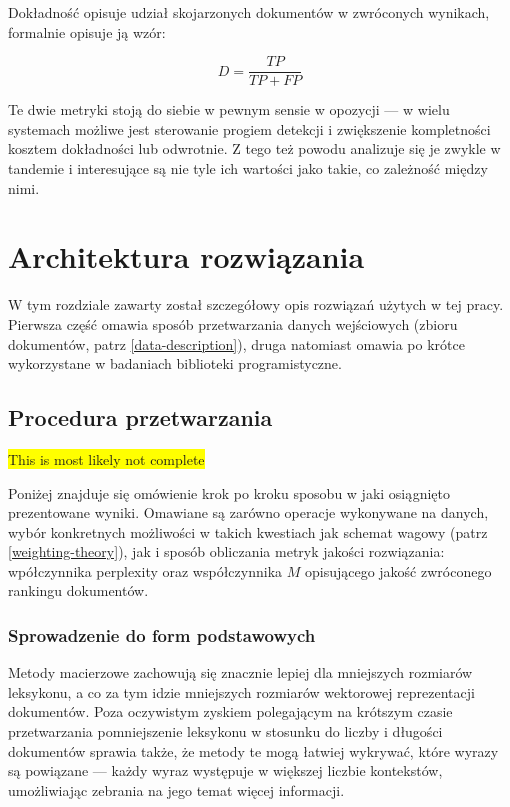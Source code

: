 \documentclass[11pt,a4paper]{article}
\newcommand{\todo}[1]{\colorbox{yellow}{#1}}
\begin{document}
Dokładność opisuje udział skojarzonych dokumentów w zwróconych wynikach, formalnie
opisuje ją wzór:

\begin{equation}
  D = \frac{TP}{TP + FP}
\end{equation}

Te dwie metryki stoją do siebie w pewnym sensie w opozycji --- w wielu
systemach możliwe jest sterowanie progiem detekcji i zwiększenie kompletności
kosztem dokładności lub odwrotnie. Z tego też powodu analizuje się je zwykle w
tandemie i interesujące są nie tyle ich wartości jako takie, co zależność
między nimi.

\pagebreak

\section{Architektura rozwiązania}
\label{sec:solution}

W tym rozdziale zawarty został szczegółowy opis rozwiązań użytych w tej pracy.
Pierwsza część omawia sposób przetwarzania danych wejściowych (zbioru
dokumentów, patrz \ref{data-description}), druga natomiast omawia po krótce
wykorzystane w badaniach biblioteki programistyczne.

\subsection{Procedura przetwarzania}

\todo{This is most likely not complete}

Poniżej znajduje się omówienie krok po kroku sposobu w jaki osiągnięto
prezentowane wyniki. Omawiane są zarówno operacje wykonywane na danych, wybór
konkretnych możliwości w takich kwestiach jak schemat wagowy (patrz
\ref{weighting-theory}), jak i sposób obliczania metryk jakości rozwiązania:
wpółczynnika perplexity oraz współczynnika $M$ opisującego
jakość zwróconego rankingu dokumentów.

\subsubsection{Sprowadzenie do form podstawowych}

Metody macierzowe zachowują się znacznie lepiej dla mniejszych rozmiarów
leksykonu, a co za tym idzie mniejszych rozmiarów wektorowej reprezentacji
dokumentów. Poza oczywistym zyskiem polegającym na krótszym czasie
przetwarzania pomniejszenie leksykonu w stosunku do liczby i długości
dokumentów sprawia także, że metody te mogą łatwiej wykrywać, które wyrazy są
powiązane --- każdy wyraz występuje w większej liczbie kontekstów, umożliwiając
zebrania na jego temat więcej informacji.
\end{document}
